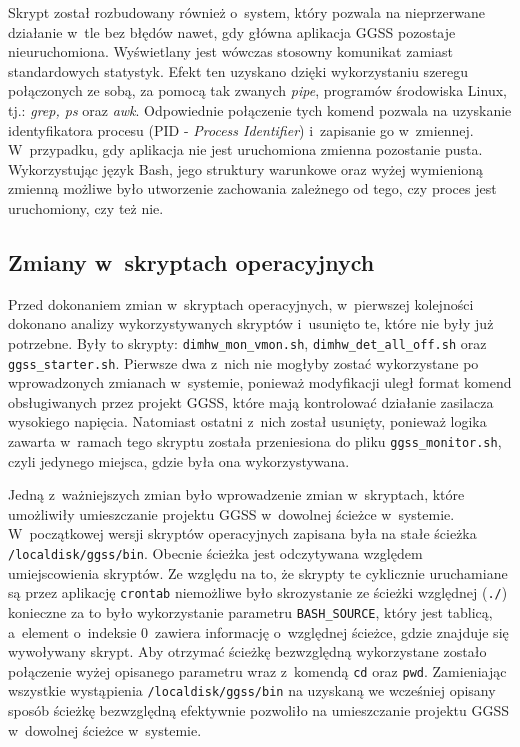 Skrypt został rozbudowany również o~system, który pozwala na nieprzerwane działanie w~tle bez błędów nawet, gdy główna aplikacja GGSS pozostaje nieuruchomiona. Wyświetlany jest wówczas stosowny komunikat zamiast standardowych statystyk. Efekt ten uzyskano dzięki wykorzystaniu szeregu połączonych ze sobą, za pomocą tak zwanych \emph{pipe}, programów środowiska Linux, tj.: \emph{grep, ps} \cite{man} oraz \emph{awk}. Odpowiednie połączenie tych komend pozwala na uzyskanie identyfikatora procesu (PID - \emph{Process Identifier}) i~zapisanie go w~zmiennej. W~przypadku, gdy aplikacja nie jest uruchomiona zmienna pozostanie pusta. Wykorzystując język Bash, jego struktury warunkowe oraz wyżej wymienioną zmienną możliwe było utworzenie zachowania zależnego od tego, czy proces jest uruchomiony, czy też nie.

\subsection{Zmiany w~skryptach operacyjnych}
Przed dokonaniem zmian w~skryptach operacyjnych, w~pierwszej kolejności dokonano analizy wykorzystywanych skryptów i~usunięto te, które nie były już potrzebne. Były to skrypty: \lstinline{dimhw_mon_vmon.sh}, \lstinline{dimhw_det_all_off.sh} oraz \lstinline{ggss_starter.sh}. Pierwsze dwa z~nich nie mogłyby zostać wykorzystane po wprowadzonych zmianach w~systemie, ponieważ modyfikacji uległ format komend obsługiwanych przez projekt GGSS, które mają kontrolować działanie zasilacza wysokiego napięcia. Natomiast ostatni z~nich został usunięty, ponieważ logika zawarta w~ramach tego skryptu została przeniesiona do pliku \lstinline{ggss_monitor.sh}, czyli jedynego miejsca, gdzie była ona wykorzystywana.

Jedną z~ważniejszych zmian było wprowadzenie zmian w~skryptach, które umożliwiły umieszczanie projektu GGSS w~dowolnej ścieżce w~systemie. W~początkowej wersji skryptów operacyjnych zapisana była na stałe ścieżka \lstinline{/localdisk/ggss/bin}. Obecnie ścieżka jest odczytywana względem umiejscowienia skryptów. Ze względu na to, że skrypty te cyklicznie uruchamiane są przez aplikację \lstinline{crontab} niemożliwe było skrozystanie ze ścieżki względnej (\lstinline{./}) konieczne za to było wykorzystanie parametru \lstinline{BASH_SOURCE}, który jest tablicą, a~element o~indeksie 0~zawiera informację o~względnej ścieżce, gdzie znajduje się wywoływany skrypt. Aby otrzymać ścieżkę bezwzględną wykorzystane zostało połączenie wyżej opisanego parametru wraz z~komendą \lstinline{cd} oraz \lstinline{pwd}. Zamieniając wszystkie wystąpienia \lstinline{/localdisk/ggss/bin} na uzyskaną we wcześniej opisany sposób ścieżkę bezwzględną efektywnie pozwoliło na umieszczanie projektu GGSS w~dowolnej ścieżce w~systemie.

